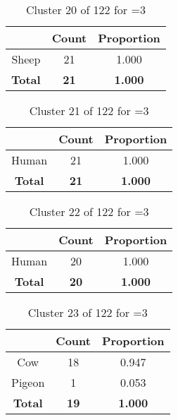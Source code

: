 \clearpage
\begin{table}[ht!]
\centering
\begin{tabular}{|c|c|c|}
\hline
\bf \Spec{} &\bf Count &\bf Proportion\\ \hline \hline
Sheep & 21 & 1.000\\ \hline
\hline
\bf Total & \bf 21 & \bf 1.000\\ \hline
\end{tabular}
\label{tab:cluster:20:3}
\caption{Cluster 20 of 122 for \minneigh{}=3}
\end{table}

\begin{table}[ht!]
\centering
\begin{tabular}{|c|c|c|}
\hline
\bf \Spec{} &\bf Count &\bf Proportion\\ \hline \hline
Human & 21 & 1.000\\ \hline
\hline
\bf Total & \bf 21 & \bf 1.000\\ \hline
\end{tabular}
\label{tab:cluster:21:3}
\caption{Cluster 21 of 122 for \minneigh{}=3}
\end{table}

\begin{table}[ht!]
\centering
\begin{tabular}{|c|c|c|}
\hline
\bf \Spec{} &\bf Count &\bf Proportion\\ \hline \hline
Human & 20 & 1.000\\ \hline
\hline
\bf Total & \bf 20 & \bf 1.000\\ \hline
\end{tabular}
\label{tab:cluster:22:3}
\caption{Cluster 22 of 122 for \minneigh{}=3}
\end{table}

\begin{table}[ht!]
\centering
\begin{tabular}{|c|c|c|}
\hline
\bf \Spec{} &\bf Count &\bf Proportion\\ \hline \hline
Cow & 18 & 0.947\\ \hline
Pigeon & 1 & 0.053\\ \hline
\hline
\bf Total & \bf 19 & \bf 1.000\\ \hline
\end{tabular}
\label{tab:cluster:23:3}
\caption{Cluster 23 of 122 for \minneigh{}=3}
\end{table}

